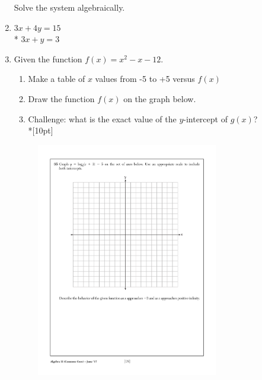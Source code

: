 \documentclass[12pt, oneside]{article}
\begin{document}
\begin{enumerate}
Solve the system algebraically.
\item
$3x+4y=15$\\*
$3x+y=3$

\newpage
\item Given the function $f(x)=x^2-x-12$.
\begin{enumerate}
    \item Make a table of $x$ values from -5 to +5 versus $f(x)$
    \item Draw the function $f(x)$ on the graph below.
    \item Challenge: what is the exact value of the $y$-intercept of $g(x)$?\\*[10pt]
\end{enumerate}

\begin{figure}[!ht]
    \centering
    \includegraphics[width=0.75\textwidth]{regents-grid.pdf}
\end{figure}

\end{enumerate}
\end{document}
